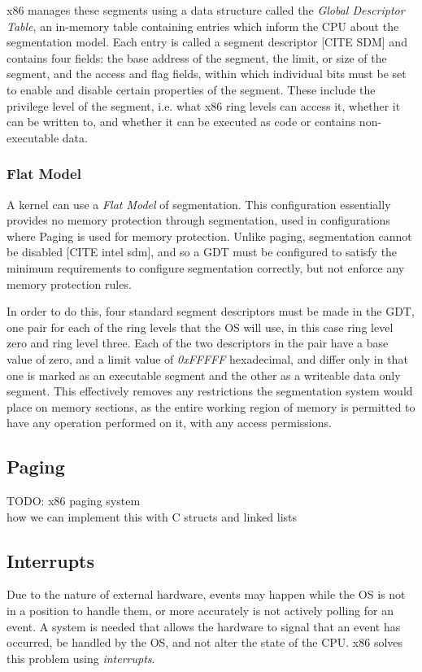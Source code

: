 \documentclass[11pt]{report}
\begin{document}
x86 manages these segments using a data structure called the \textit{Global Descriptor Table}, an in-memory table containing entries which inform the CPU about the segmentation model. Each entry is called a segment descriptor [CITE SDM] and contains four fields: the base address of the segment, the limit, or size of the segment, and the access and flag fields, within which individual bits must be set to enable and disable certain properties of the segment. These include the privilege level of the segment, i.e. what x86 ring levels can access it, whether it can be written to, and whether it can be executed as code or contains non-executable data.

\subsubsection{Flat Model}
A kernel can use a \textit{Flat Model} of segmentation. This configuration essentially provides no memory protection through segmentation, used in configurations where Paging is used for memory protection. Unlike paging, segmentation cannot be disabled [CITE intel sdm], and so a GDT must be configured to satisfy the minimum requirements to configure segmentation correctly, but not enforce any memory protection rules.

In order to do this, four standard segment descriptors must be made in the GDT, one pair for each of the ring levels that the OS will use, in this case ring level zero and ring level three. Each of the two descriptors in the pair have a base value of zero, and a limit value of \textit{0xFFFFF} hexadecimal, and differ only in that one is marked as an executable segment and the other as a writeable data only segment. This effectively removes any restrictions the segmentation system would place on memory sections, as the entire working region of memory is permitted to have any operation performed on it, with any access permissions.

\subsection{Paging}
TODO: x86 paging system \\
how we can implement this with C structs and linked lists \\

\subsection{Interrupts}
Due to the nature of external hardware, events may happen while the OS is not in a position to handle them, or more accurately is not actively polling for an event. A system is needed that allows the hardware to signal that an event has occurred, be handled by the OS, and not alter the state of the CPU. x86 solves this problem using \textit{interrupts}.
\end{document}
